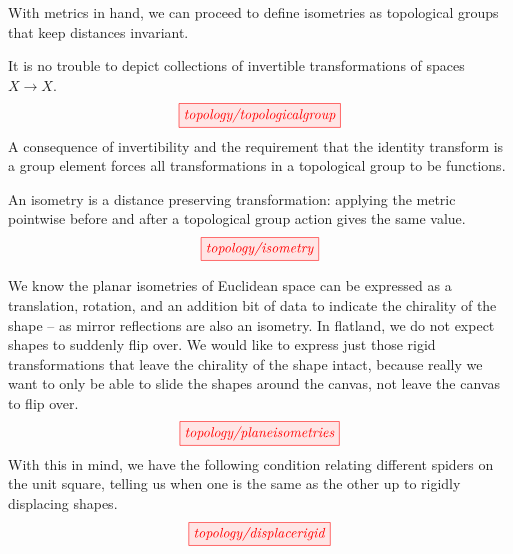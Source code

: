 \begin{myboxB}
With metrics in hand, we can proceed to define isometries as topological groups that keep distances invariant.
\begin{defn}\label{def:topgrp} 
It is no trouble to depict collections of invertible transformations of spaces $X \rightarrow X$.
\[\tikzfig{topology/topologicalgroup}\]
A consequence of invertibility and the requirement that the identity transform is a group element forces all transformations in a topological group to be functions.
\end{defn}
\begin{defn}[Isometry]\label{def:isometry}
An isometry is a distance preserving transformation: applying the metric pointwise before and after a topological group action gives the same value.
\[\tikzfig{topology/isometry}\]
\end{defn}
\end{myboxB}

\begin{myboxB}
\begin{defn}\label{defn:planarisometry}
We know the planar isometries of Euclidean space can be expressed as a translation, rotation, and an addition bit of data to indicate the chirality of the shape -- as mirror reflections are also an isometry. In flatland, we do not expect shapes to suddenly flip over. We would like to express just those rigid transformations that leave the chirality of the shape intact, because really we want to only be able to slide the shapes around the canvas, not leave the canvas to flip over.
\[\tikzfig{topology/planeisometries}\]
With this in mind, we have the following condition relating different spiders on the unit square, telling us when one is the same as the other up to rigidly displacing shapes.
\[\tikzfig{topology/displacerigid}\]
\end{defn}
\end{myboxB}

